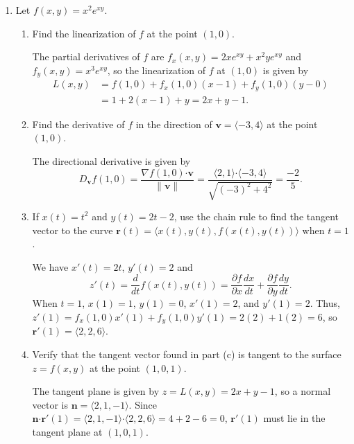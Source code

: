 \documentclass[12pt]{article}
\newcommand{\points}[1]{\marginpar{\hspace{24pt}[#1]}}
\newcommand{\dotp}{\boldsymbol{\cdot}}
\newcommand{\pd}[2]{\frac{\partial #1}{\partial #2}}
\newcommand{\rd}[2]{\frac{d #1}{d #2}}
\begin{document}
\begin{enumerate}
\item Let $f(x,y) = x^2e^{xy}$.
\begin{enumerate}
\item Find the linearization of $f$ at the point $(1,0)$. \points{4}

\bigskip

The partial derivatives of $f$ are $f_x(x,y) = 2xe^{xy}+x^2ye^{xy}$ and $f_y(x,y) = x^3e^{xy}$, so the linearization of $f$ at $(1,0)$ is given by
\begin{align*}
L(x,y) & = f(1,0)+f_x(1,0)(x-1)+f_y(1,0)(y-0)\\
& = 1+2(x-1)+y = 2x+y-1.
\end{align*}

\bigskip

\bigskip


\item Find the derivative of $f$ in the direction of $\mathbf{v} = \langle -3,4\rangle$ at the point $(1,0)$. \points{3}

\bigskip

The directional derivative is given by 
\[
D_{\mathbf{v}}f(1,0) = \frac{\nabla f(1,0)\dotp \mathbf{v}}{\lVert \mathbf{v}\rVert} = \frac{\langle 2,1\rangle \dotp \langle -3,4\rangle}{\sqrt{(-3)^2+4^2}} = \frac{-2}{5}.
\]

\bigskip

\item If $x(t)=t^2$ and $y(t)=2t-2$, use the chain rule to find the tangent vector to the curve $\mathbf{r}(t) = \langle x(t),y(t),f(x(t),y(t))\rangle$ when $t=1$. \points{5}

\bigskip

We have $x'(t) = 2t$, $y'(t) = 2$ and
\[
z'(t) = \frac{d}{dt}f(x(t),y(t)) = \pd{f}{x}\rd{x}{t}+\pd{f}{y}\rd{y}{t}.
\]
When $t=1$, $x(1)=1$, $y(1)=0$, $x'(1)=2$, and $y'(1) = 2$. Thus, $z'(1) = f_x(1,0)x'(1)+f_y(1,0)y'(1) = 2(2)+1(2)=6$, so $\mathbf{r}'(1) = \langle 2,2,6\rangle$.

\bigskip

\item Verify that the tangent vector found in part (c) is tangent to the surface $z=f(x,y)$ at the point $(1,0,1)$.\points{3}

\bigskip

The tangent plane is given by $z=L(x,y) = 2x+y-1$, so a normal vector is $\mathbf{n} = \langle 2,1,-1\rangle$. Since $\mathbf{n}\dotp \mathbf{r}'(1) = \langle 2,1,-1\rangle\dotp \langle 2,2,6\rangle = 4+2-6=0$, $\mathbf{r}'(1)$ must lie in the tangent plane at $(1,0,1)$.


\end{enumerate}
\end{enumerate}
\end{document}
